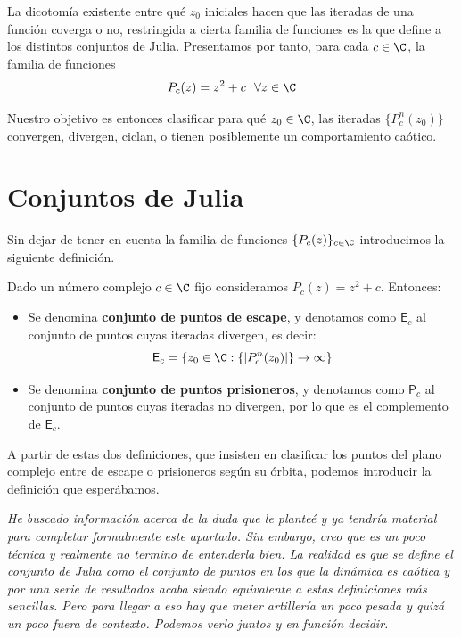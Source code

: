 La dicotomía existente entre qué $z_0$ iniciales hacen que las iteradas de una función coverga o no, restringida a cierta familia de funciones es la que define a los distintos conjuntos de Julia. Presentamos por tanto, para cada $c\in\C$, la familia de funciones
\begin{equation}
  P_c(z) = z^2 +c \ \ \forall z\in\C
\end{equation}

Nuestro objetivo es entonces clasificar para qué $z_0\in\C$, las iteradas $\{P_c^n(z_0)\}$ convergen, divergen, ciclan, o tienen posiblemente un comportamiento caótico.

\section{Conjuntos de Julia}

Sin dejar de tener en cuenta la familia de funciones $\{P_c(z)\}_{c\in\C}$ introducimos la siguiente definición.

\begin{definicion}
  Dado un número complejo $c\in\C$ fijo consideramos $P_c(z)=z^2+c$. Entonces:
  \begin{itemize}
    \item Se denomina \textbf{conjunto de puntos de escape}, y denotamos como $\mathsf{E}_c$ al conjunto de puntos cuyas iteradas divergen, es decir:
    $$
    \mathsf{E}_c = \{z_0\in\C: \{|P_c^n(z_0)|\}\rightarrow \infty \}
    $$
    \item  Se denomina \textbf{conjunto de puntos prisioneros}, y denotamos como $\mathsf{P}_c$ al conjunto de puntos cuyas iteradas no divergen, por lo que es el complemento de $\mathsf{E}_c$.
  \end{itemize}
\end{definicion}

A partir de estas dos definiciones, que insisten en clasificar los puntos del plano complejo entre de escape o prisioneros según su órbita, podemos introducir la definición que esperábamos.

\textit{He buscado información acerca de la duda que le planteé y ya tendría material para completar formalmente este apartado. Sin embargo, creo que es un poco técnica y realmente no termino de entenderla bien. La realidad es que se define el conjunto de Julia como el conjunto de puntos en los que la dinámica es caótica y por una serie de resultados acaba siendo equivalente a estas definiciones más sencillas. Pero para llegar a eso hay que meter artillería un poco pesada y quizá un poco fuera de contexto. Podemos verlo juntos y en función decidir.}

